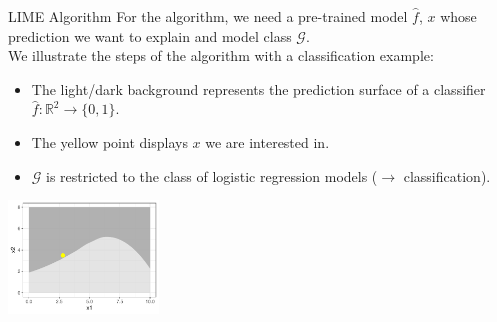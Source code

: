 \documentclass[aspectratio=169]{../latex_main/tntbeamer}  %
\begin{document}
\begin{frame}{LIME Algorithm }
    \vspace{-1em}
		For the algorithm, we need a pre-trained model $\hat{f}$, $x$ whose prediction we want to explain and model class $\mathcal{G}$.\\ \vspace{0.5cm}
		We illustrate the steps of the algorithm with a classification example: 
		\begin{itemize}
			\item The light/dark background represents the prediction surface of a \alert{classifier} $\hat{f}: \mathbb{R}^2 \to \{0, 1\}$.
			\item The yellow point displays $x$ we are interested in. 
			\item $\mathcal{G}$ is restricted to the class of logistic regression models ($\to$ classification). 
		\end{itemize}
		\begin{center}
			\includegraphics[width=0.3\textwidth]{figure/lime2}
		\end{center}

\end{frame}
\end{document}
